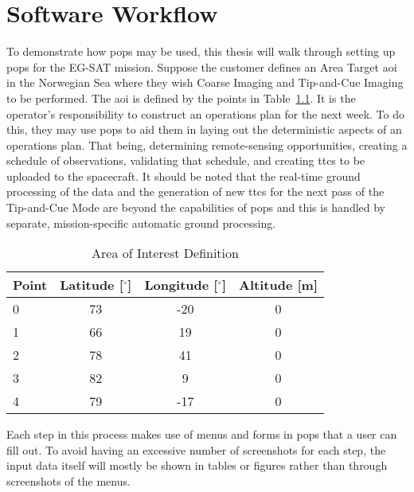 \glsresetall{} 


\chapter{Software Workflow}\label{chap:workflow}

\lettrine[lines=2, findent=0pt, nindent=5pt]{T}{}o demonstrate how \gls{pops}
may be used, this thesis will walk through setting up \gls{pops} for the EG-SAT
mission. Suppose the customer defines an Area Target \gls{aoi} in the Norwegian
Sea where they wish Coarse Imaging and Tip-and-Cue Imaging to be performed. The
\gls{aoi} is defined by the points  in Table~\ref{tab:norway-aoi}. It is the
operator’s responsibility to construct an operations plan for the next week. To
do this, they may use \gls{pops} to aid them in laying out the deterministic
aspects of an operations plan.  That being, determining remote-sensing
opportunities, creating a schedule of observations, validating that schedule,
and creating \glspl{ttc} to be uploaded to the spacecraft. It should be noted
that the real-time ground processing of the data and the generation of new
\glspl{ttc} for the next pass of the Tip-and-Cue Mode are beyond the
capabilities of \gls{pops} and this is handled by separate, mission-specific
automatic ground processing.

\begin{table}[h] 
    \centering
    \caption{Area of Interest Definition}
    \begin{tabular}{cccc}
	Point                  & Latitude [$^\circ$] & Longitude [$^\circ$] & Altitude [m] \\ \hline
	\multicolumn{1}{l|}{0} & 73       & -20      & 0        \\
	\multicolumn{1}{l|}{1} & 66       & 19       & 0        \\
	\multicolumn{1}{l|}{2} & 78       & 41       & 0        \\
	\multicolumn{1}{l|}{3} & 82       & 9        & 0        \\
	\multicolumn{1}{l|}{4} & 79       & -17      & 0       
    \end{tabular}
    \label{tab:norway-aoi}
\end{table}

Each step in this process makes use of menus and forms in \gls{pops} that a
user can fill out. To avoid having an excessive number of screenshots for each
step, the input data itself will mostly be shown in tables or figures rather than
through screenshots of the menus.

